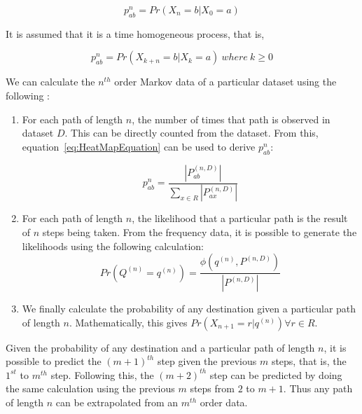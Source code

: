 \begin{equation}
    p^{n}_{ab} = Pr(X_{n}=b|X_{0}=a)
\end{equation}

It is assumed that it is a time homogeneous process, that is,

\begin{equation}
    p^{n}_{ab} = Pr(X_{k+n}=b|X_{k}=a) \ where\  k \geq 0
\end{equation}



We can calculate the $n^{th}$ order Markov data of a particular dataset using the following :
\begin{enumerate}
    \item For each path of length $n$, the number of times that path is observed in dataset $D$. This can be directly counted from the dataset. From this, equation~\ref{eq:HeatMapEquation} can be used to derive $p^{n}_{ab}$:

    \begin{equation}
        p^{n}_{ab} = \frac{\left\vert{P^{(n,D)}_{ab}}\right\vert}{\sum\limits_{x\in R}\left\vert{P^{(n,D)}_{ax}}\right\vert}
        \label{eq:HeatMapEquation}
    \end{equation}

    \item For each path of length $n$, the likelihood that a particular path is the result of $n$ steps being taken.
    From the frequency data, it is possible to generate the likelihoods using the following calculation:
    \begin{equation}
        Pr(Q^{(n)}=q^{(n)}) = \frac{\phi(q^{(n)},P^{(n,D)})}{\left\vert{P^{(n,D)}}\right\vert}
        \label{eq:TableEquation}
    \end{equation}


    \item We finally calculate the  probability of any destination given a particular path of length $n$. Mathematically, this gives $Pr(X_{n+1}=r|q^{(n)}) \forall r \in R$.

\end{enumerate}


Given the probability of any destination and a particular path of length $n$, it is possible to predict the $(m+1)^{th}$ step given the previous $m$ steps, that is, the $1^{st}$ to $m^{th}$ step. Following this, the $(m+2)^{th}$ step can be predicted by doing the same calculation using the previous $m$ steps from $2$ to $m+1$. Thus any path of length $n$ can be extrapolated from an $m^{th}$ order data.



